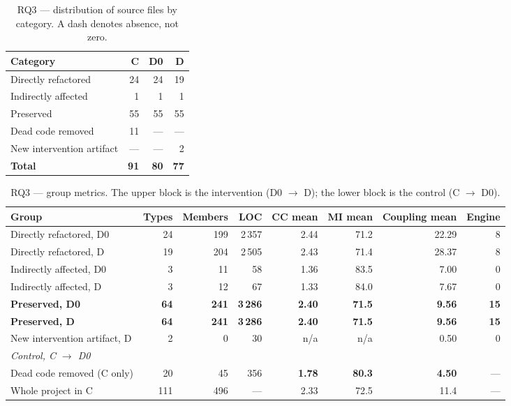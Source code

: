 \documentclass[pdflatex,sn-basic]{sn-jnl}
\begin{document}
\begin{table}[!htbp]
\centering
\caption{RQ3 --- distribution of source files by category. A dash denotes absence, not zero.}\label{tab:rq3dist}
\small
\begin{tabular}{lrrr}
\toprule
\textbf{Category} & \textbf{C} & \textbf{D0} & \textbf{D} \\
\midrule
Directly refactored        & 24 & 24 & 19 \\
Indirectly affected        & 1  & 1  & 1 \\
Preserved                  & 55 & 55 & 55 \\
Dead code removed          & 11 & ---& --- \\
New intervention artifact  & ---& ---& 2 \\
\midrule
\textbf{Total}             & \textbf{91} & \textbf{80} & \textbf{77} \\
\bottomrule
\end{tabular}
\end{table}

\begin{table}[!htbp]
\centering
\caption{RQ3 --- group metrics. The upper block is the intervention (D0 $\rightarrow$ D); the lower block is the control (C $\rightarrow$ D0).}\label{tab:rq3metrics}
\footnotesize
\setlength{\tabcolsep}{1.8pt}
\begin{tabular}{lrrrrrrr}
\toprule
\textbf{Group} & \textbf{Types} & \textbf{Members} & \textbf{LOC} & \textbf{CC mean} & \textbf{MI mean} & \textbf{Coupling mean} & \textbf{Engine} \\
\midrule
Directly refactored, D0   & 24 & 199 & 2\,357 & 2.44 & 71.2 & 22.29 & 8 \\
Directly refactored, D    & 19 & 204 & 2\,505 & 2.43 & 71.4 & 28.37 & 8 \\
\addlinespace
Indirectly affected, D0   & 3  & 11  & 58    & 1.36 & 83.5 & 7.00  & 0 \\
Indirectly affected, D    & 3  & 12  & 67    & 1.33 & 84.0 & 7.67  & 0 \\
\addlinespace
\textbf{Preserved, D0}    & \textbf{64} & \textbf{241} & \textbf{3\,286} & \textbf{2.40} & \textbf{71.5} & \textbf{9.56} & \textbf{15} \\
\textbf{Preserved, D}     & \textbf{64} & \textbf{241} & \textbf{3\,286} & \textbf{2.40} & \textbf{71.5} & \textbf{9.56} & \textbf{15} \\
\addlinespace
New intervention artifact, D & 2 & 0 & 30 & n/a & n/a & 0.50 & 0 \\
\midrule
\multicolumn{8}{l}{\emph{Control, C $\rightarrow$ D0}} \\
Dead code removed (C only) & 20 & 45  & 356 & \textbf{1.78} & \textbf{80.3} & \textbf{4.50} & --- \\
Whole project in C & 111 & 496 & --- & 2.33 & 72.5 & 11.4 & --- \\
\bottomrule
\end{tabular}
\end{table}
\end{document}
